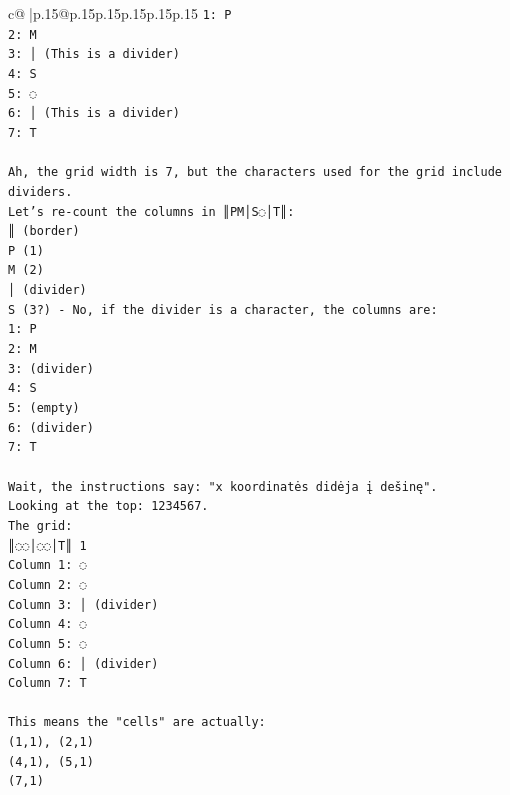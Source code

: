 \documentclass{article}
\begin{document}
{\begin{supertabular}{c@{$\;$}|p{.15\linewidth}@{}p{.15\linewidth}p{.15\linewidth}p{.15\linewidth}p{.15\linewidth}p{.15\linewidth}}
{{{\texttt{1: P} \\
\texttt{2: M} \\
\texttt{3: │ (This is a divider)} \\
\texttt{4: S} \\
\texttt{5: ◌} \\
\texttt{6: │ (This is a divider)} \\
\texttt{7: T} \\
\\ 
\texttt{Ah, the grid width is 7, but the characters used for the grid include dividers.} \\
\texttt{Let's re{-}count the columns in ║PM│S◌│T║:} \\
\texttt{║ (border)} \\
\texttt{P (1)} \\
\texttt{M (2)} \\
\texttt{│ (divider)} \\
\texttt{S (3?) {-} No, if the divider is a character, the columns are:} \\
\texttt{1: P} \\
\texttt{2: M} \\
\texttt{3: (divider)} \\
\texttt{4: S} \\
\texttt{5: (empty)} \\
\texttt{6: (divider)} \\
\texttt{7: T} \\
\\ 
\texttt{Wait, the instructions say: "x koordinatės didėja į dešinę".} \\
\texttt{Looking at the top:  1234567.} \\
\texttt{The grid:} \\
\texttt{║◌◌│◌◌│T║ 1} \\
\texttt{Column 1: ◌} \\
\texttt{Column 2: ◌} \\
\texttt{Column 3: │ (divider)} \\
\texttt{Column 4: ◌} \\
\texttt{Column 5: ◌} \\
\texttt{Column 6: │ (divider)} \\
\texttt{Column 7: T} \\
\\ 
\texttt{This means the "cells" are actually:} \\
\texttt{(1,1), (2,1)} \\
\texttt{(4,1), (5,1)} \\
\texttt{(7,1)} \\
}}}
\end{supertabular}}
\end{document}

